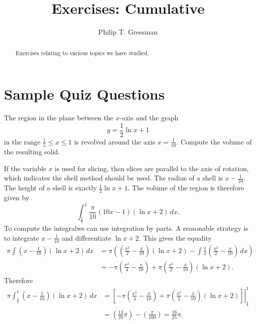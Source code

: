 \documentclass{ximera}
\title{Exercises: Cumulative}
\author{Philip T. Gressman}
\begin{document}
\begin{abstract}
Exercises relating to various topics we have studied.
\end{abstract}
\maketitle


\section*{Sample Quiz Questions}

\begin{question}%

The region in the plane between the  \(x\)-axis and the graph
\[ y = \frac{1}{2} \ln{x} + 1 \]
 in the range \(\frac{1}{5} \leq x \leq 1\) is revolved around the axis \(x = \frac{1}{10}\). Compute the volume of the resulting solid.
\begin{multiplechoice}
\end{multiplechoice}
\begin{feedback}
If the variable \(x\) is used for slicing, then slices are parallel to the axis of rotation, which indicates the shell method should be used.
The radius of a shell is \(x - \frac{1}{10}\). The height of a shell is exactly \(\frac{1}{2} \ln{x} + 1\).
The volume of the region is therefore given by
\[ \int_{\frac{1}{5}}^{1} \frac{\pi}{10} \left(10 x - 1\right) \left(\ln{x} + 2\right)\, dx. \]
 To compute the integralwe can use integration by parts. A reasonable strategy is to integrate  \(x - \frac{1}{10}\) and differentiate  \(\ln{x} + 2\).
 This gives the equality
\[ \begin{aligned} \pi \int \left(x - \frac{1}{10}\right) \left(\ln{x} + 2\right)\, dx & = \pi \left(\left(\frac{x^{2}}{2} - \frac{x}{10}\right) \left(\ln{x} + 2\right) - \int \frac{1}{x} \left(\frac{x^{2}}{2} - \frac{x}{10}\right)\, dx\right) \\
 & = - \pi \left(\frac{x^{2}}{4} - \frac{x}{10}\right) + \pi \left(\frac{x^{2}}{2} - \frac{x}{10}\right) \left(\ln{x} + 2\right). \end{aligned} \]
Therefore 
\[ \begin{aligned} \pi \int_{\frac{1}{5}}^{1} \left(x - \frac{1}{10}\right) \left(\ln{x} + 2\right)\, dx & = \left. \left[- \pi \left(\frac{x^{2}}{4} - \frac{x}{10}\right) + \pi \left(\frac{x^{2}}{2} - \frac{x}{10}\right) \left(\ln{x} + 2\right) \right] \right|_{\frac{1}{5}}^{1}\\ & = \left(\frac{13}{20} \pi \right) - \left(\frac{\pi}{100} \right) = \frac{16}{25} \pi. \end{aligned} \]
\end{feedback}

\end{question}
\end{document}
